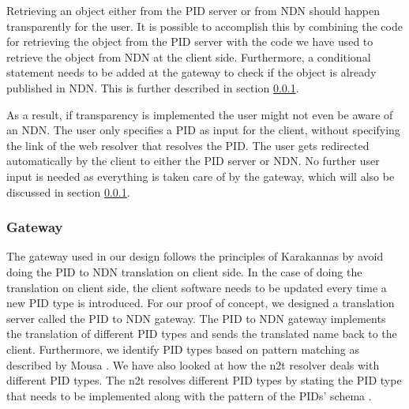 Retrieving an object either from the PID server or from NDN should happen transparently for the user. It is possible to accomplish this by combining the code for retrieving the object from the PID server with the code we have used to retrieve the object from NDN at the client side. Furthermore, a conditional statement needs to be added at the gateway to check if the object is already published in NDN. This is further described in section \ref{gw}.

As a result, if transparency is implemented the user might not even be aware of an NDN. The user only specifies a PID as input for the client, without specifying the link of the web resolver that resolves the PID. The user gets redirected automatically by the client to either the PID server or NDN. No further user input is needed as everything is taken care of by the gateway, which will also be discussed in section \ref{gw}.

\subsubsection{Gateway}\label{gw}
The gateway used in our design follows the principles of Karakannas by avoid doing the PID to NDN translation on client side. In the case of doing the translation on client side, the client software needs to be updated every time a new PID type is introduced. For our proof of concept, we designed a translation server called the PID to NDN gateway. The PID to NDN gateway implements the translation of different PID types and sends the translated name back to the client. Furthermore, we identify PID types based on pattern matching as described by Mousa \cite{ndn-app-aware}. We have also looked at how the \gls{n2t} resolver deals with different PID types. The \gls{n2t} resolves different PID types by stating the PID type that needs to be implemented along with the pattern of the PIDs' schema \cite{n2t}.

